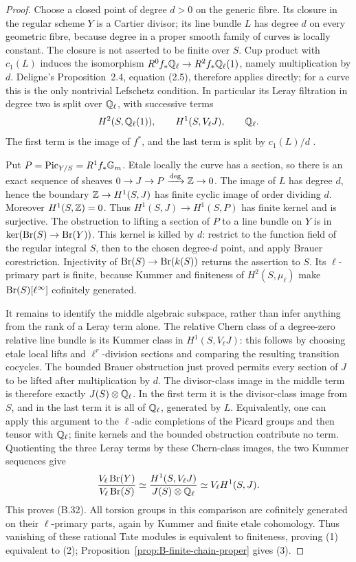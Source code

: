 \begin{proof}
Choose a closed point of degree \(d>0\) on the generic fibre.
Its closure in the regular scheme \(Y\) is a Cartier divisor;
its line bundle \(L\) has degree \(d\) on every geometric
fibre, because degree in a proper smooth family of curves is locally
constant.  The closure is not asserted to be finite over \(S\).
Cup product with \(c_1(L)\) induces the isomorphism
\(R^0f_*\mathbb Q_\ell\to R^2f_*\mathbb Q_\ell(1)\), namely
multiplication by \(d\).  Deligne's Proposition~2.4, equation
(2.5), therefore applies directly; for a curve this is the only
nontrivial Lefschetz condition.  In particular its Leray filtration
in degree two is split over \(\mathbb Q_\ell\), with successive terms
\[
 H^2(S,\mathbb Q_\ell(1)),\qquad
 H^1(S,V_\ell J),\qquad \mathbb Q_\ell.
\]
The first term is the image of \(f^*\), and the last term is
split by \(c_1(L)/d\)
\cite[Proposition~2.4, (2.5), pp.~111--112]{c_deligne1968}.

Put \(P=\operatorname{Pic}_{Y/S}=R^1f_*{\mathbb G_m}\).  Etale locally the
curve has a section, so there is an exact sequence of sheaves
\(0\to J\to P\xrightarrow{\deg}\mathbb Z\to0\).
The image of \(L\) has degree \(d\), hence the boundary
\(\mathbb Z\to H^1(S,J)\) has finite cyclic image of order dividing
\(d\).  Moreover \(H^1(S,\mathbb Z)=0\).  Thus
\(H^1(S,J)\to H^1(S,P)\) has finite kernel and is surjective.
The obstruction to lifting a section of \(P\) to a line bundle
on \(Y\) is in
\(\ker(\operatorname{Br}(S)\to\operatorname{Br}(Y))\).  This kernel is killed by
\(d\): restrict to the function field of the regular integral
\(S\), then to the chosen degree-\(d\) point, and apply
Brauer corestriction.  Injectivity of \(\operatorname{Br}(S)\to\operatorname{Br}(k(S))\)
returns the assertion to \(S\).  Its \(\ell\)-primary part
is finite, because Kummer and finiteness of
\(H^2(S,\mu_\ell)\) make \(\operatorname{Br}(S)[\ell^\infty]\)
cofinitely generated.

It remains to identify the middle algebraic subspace, rather than
infer anything from the rank of a Leray term alone.  The relative
Chern class of a degree-zero relative line bundle is its Kummer
class in \(H^1(S,V_\ell J)\): this follows by choosing etale
local lifts and \(\ell^r\)-division sections and comparing the
resulting transition cocycles.  The bounded Brauer obstruction just
proved permits every section of \(J\) to be lifted after
multiplication by \(d\).  The divisor-class image in the
middle term is therefore exactly \(J(S)\otimes\mathbb Q_\ell\).
In the first term it is the divisor-class image from \(S\),
and in the last term it is all of \(\mathbb Q_\ell\), generated by
\(L\).  Equivalently, one can apply this argument to the
\(\ell\)-adic completions of the Picard groups and then tensor
with \(\mathbb Q_\ell\); finite kernels and the bounded obstruction
contribute no term.  Quotienting the three Leray terms by these
Chern-class images, the two Kummer sequences give
\[
 \frac{V_\ell\operatorname{Br}(Y)}{V_\ell\operatorname{Br}(S)}
 \simeq
 \frac{H^1(S,V_\ell J)}{J(S)\otimes\mathbb Q_\ell}
 \simeq V_\ell H^1(S,J).
\]
This proves (B.32).  All torsion groups in this comparison are
cofinitely generated on their \(\ell\)-primary parts, again by
Kummer and finite etale cohomology.  Thus vanishing of these rational
Tate modules is equivalent to finiteness, proving (1) equivalent
to (2); Proposition~\ref{prop:B-finite-chain-proper} gives (3).


\end{proof}
